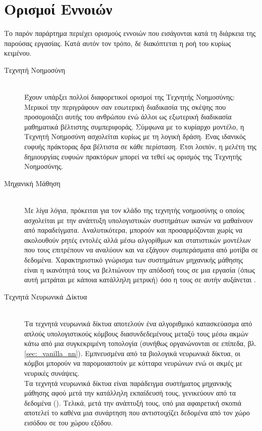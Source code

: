 \chapter{Ορισμοί Εννοιών}
\label{chap:definitions}
Το παρόν παράρτημα περιέχει ορισμούς εννοιών που εισάγονται κατά τη διάρκεια της παρούσας εργασίας. Κατά αυτόν τον τρόπο, δε διακόπτεται η ροή του κυρίως κειμένου. \cite{russell2020artificial,goodfellow2016deep,geron2019hands, bishop2006pattern} 

\begin{description}
    \item[Τεχνητή Νοημοσύνη] \hfill \\ 
    Έχουν υπάρξει πολλοί διαφορετικοί ορισμοί της Τεχνητής Νοημοσύνης: Μερικοί την περιγράφουν σαν εσωτερική διαδικασία της σκέψης που προσομοιάζει αυτής του ανθρώπου ενώ άλλοι ως εξωτερική διαδικασία μαθηματικά βέλτιστης συμπεριφοράς. Σύμφωνα με το κυρίαρχο μοντέλο, η Τεχνητή Νοημοσύνη ασχολείται κυρίως με τη λογική δράση. Ένας ιδανικός ευφυής πράκτορας δρα βέλτιστα σε κάθε περίσταση. Έτσι λοιπόν, η μελέτη της δημιουργίας ευφυών πρακτόρων μπορεί να τεθεί ως ορισμός της Τεχνητής Νοημοσύνης.
    \item[Μηχανική Μάθηση] \hfill \\ 
    Με λίγα λόγια, πρόκειται για τον κλάδο της τεχνητής νοημοσύνης ο οποίος ασχολείται με την ανάπτυξη υπολογιστικών συστημάτων ικανών να μαθαίνουν από παραδείγματα. Αναλυτικότερα, μπορούν και προσαρμόζονται χωρίς να ακολουθούν ρητές εντολές αλλά μέσω αλγορίθμων και στατιστικών μοντέλων που τους επιτρέπουν να αναλύουν και να εξάγουν συμπεράσματα από μοτίβα σε δεδομένα. Χαρακτηριστικό γνώρισμα των συστημάτων μηχανικής μάθησης είναι η ικανότητά τους να βελτιώνουν την απόδοσή τους σε μια εργασία (όπως αυτή μετράται με κάποια κατάλληλη μετρική) όσο η  τους σε αυτήν αυξάνεται \cite{mitchell1997machine}.
    \item[Τεχνητά Νευρωνικά Δίκτυα] \hfill \\ 
    Τα τεχνητά νευρωνικά δίκτυα αποτελούν ένα αλγοριθμικό κατασκεύασμα από απλούς υπολογιστικούς κόμβους διασυνδεδεμένους μεταξύ τους μέσω ακμών κάτω από μια συγκεκριμένη τοπολογία (συνήθως οργανώνονται σε επίπεδα, βλ. \ref{sec:_vanilla_nn}). Εμπνευσμένα από τα βιολογικά νευρωνικά δίκτυα, οι κόμβοι μπορούν να παρομοιαστούν με κύτταρα νευρώνων ενώ οι ακμές με νευρικές συνάψεις. \\
    Τα τεχνητά νευρωνικά δίκτυα είναι παράδειγμα συστήματος μηχανικής μάθησης αφού μετά την κατάλληλη εκπαίδευσή τους, γενικεύουν από τα δεδομένα (). Τελικά, μετά την ανάπτυξή τους, υπό μια αφαιρετική σκοπιά αποτελεί το καθένα μια συνάρτηση που αντιστοιχίζει δεδομένα από τον χώρο εισόδου σε  του χώρου εξόδου.

\end{description}
